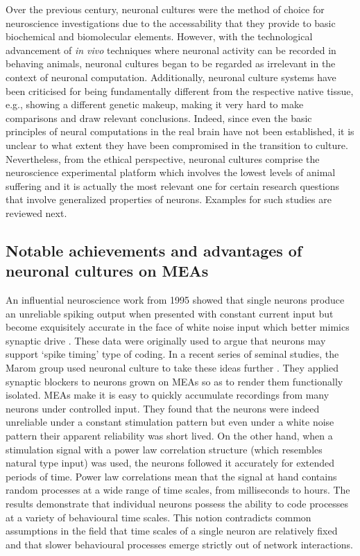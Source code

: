     Over the previous century, neuronal cultures were the method of choice for neuroscience investigations due to the accessability that they provide to basic biochemical and biomolecular elements. However, with the technological advancement of \textit{in vivo} techniques where neuronal activity can be recorded in behaving animals, neuronal cultures began to be regarded as irrelevant in the context of neuronal computation. Additionally, neuronal culture systems have been criticised for being fundamentally different from the respective native tissue, e.g., showing a different genetic makeup, making it very hard to make comparisons and draw relevant conclusions. Indeed, since even the basic principles of neural computations in the real brain have not been established, it is unclear to what extent they have been compromised in the transition to culture. Nevertheless, from the ethical perspective, neuronal cultures comprise the neuroscience experimental platform which involves the lowest levels of animal suffering and it is actually the most relevant one for certain research questions that involve generalized properties of neurons. Examples for such studies are reviewed next.

    \subsection{Notable achievements and advantages of neuronal cultures on MEAs}
	\label{sec:introduction:achievements}
    An influential neuroscience work from 1995 showed that single neurons produce an unreliable spiking output when presented with constant current input but become exquisitely accurate in the face of white noise input which better mimics synaptic drive \cite{mainen1995reliability}. These data were originally used to argue that neurons may support `spike timing' type of coding. In a recent series of seminal studies, the Marom group used neuronal culture to take these ideas further \cite{gal2013entrainment,gal2010dynamics,reinartz2014synaptic}. They applied synaptic blockers to neurons grown on MEAs so as to render them functionally isolated. MEAs make it is easy to quickly accumulate recordings from many neurons under controlled input. They found that the neurons were indeed unreliable under a constant stimulation pattern but even under a white noise pattern their apparent reliability was short lived. On the other hand, when a stimulation signal with a power law correlation structure (which resembles natural type input) was used, the neurons followed it accurately for extended periods of time. Power law correlations mean that the signal at hand contains random processes at a wide range of time scales, from milliseconds to hours. The results demonstrate that individual neurons possess the ability to code processes at a variety of behavioural time scales. This notion contradicts common assumptions in the field that time scales of a single neuron are relatively fixed and that slower behavioural processes emerge strictly out of network interactions.

